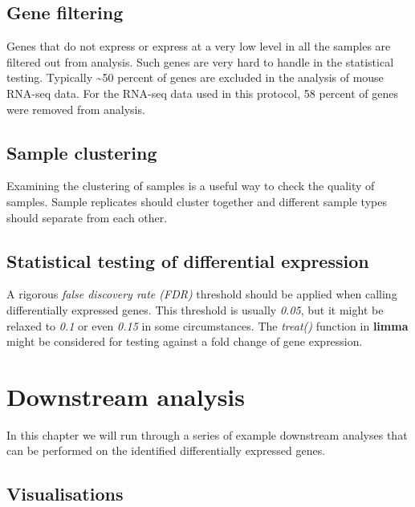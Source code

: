 \documentclass[]{book}
\begin{document}
\hypertarget{gene-filtering}{%
\section{Gene filtering}\label{gene-filtering}}

Genes that do not express or express at a very low level in all the samples are filtered out from analysis. Such genes are very hard to handle in the statistical testing. Typically \textasciitilde{}50 percent of genes are excluded in the analysis of mouse RNA-seq data. For the RNA-seq data used in this protocol, 58 percent of genes were removed from analysis.

\hypertarget{sample-clustering}{%
\section{Sample clustering}\label{sample-clustering}}

Examining the clustering of samples is a useful way to check the quality of samples. Sample
replicates should cluster together and different sample types should separate from each other.

\hypertarget{statistical-testing-of-differential-expression}{%
\section{Statistical testing of differential expression}\label{statistical-testing-of-differential-expression}}

A rigorous \emph{false discovery rate (FDR)} threshold should be applied when calling differentially
expressed genes. This threshold is usually \emph{0.05}, but it might be relaxed to \emph{0.1} or even \emph{0.15} in some circumstances. The \emph{treat()} function in \textbf{limma} might be considered for testing against a fold change of gene expression.

\hypertarget{downstream-analysis}{%
\chapter{Downstream analysis}\label{downstream-analysis}}

In this chapter we will run through a series of example downstream analyses that can be performed on the identified differentially expressed genes.

\hypertarget{visualisations}{%
\section{Visualisations}\label{visualisations}}
\end{document}
